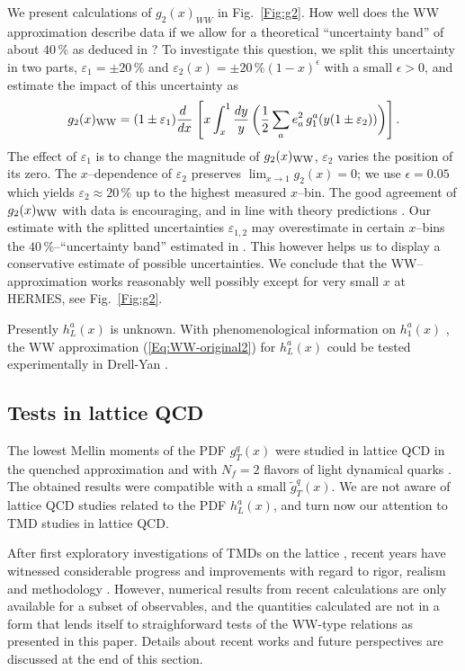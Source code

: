 \documentclass[a4paper,11pt]{article}
\newcommand{\be}{\begin{equation}}
\newcommand{\ee}{\end{equation}}
\begin{document}
We present calculations of $g_2(x)_{WW}$ in Fig.~\ref{Fig:g2}.
How well does the WW approximation describe data if we allow for a
theoretical ``uncertainty band'' of about $40\,\%$ as deduced in 
\cite{Accardi:2009au}? To investigate this question, 
we split this uncertainty in two parts, $\varepsilon_1=\pm 20\,\%$ and 
$\varepsilon_2(x)=\pm 20\,\%(1-x)^\epsilon$ with a small $\epsilon>0$,
and estimate the impact of this uncertainty as 
\be\label{Eq:g2-in-WW-model-violation}
    g_2(x)_{\rm WW} = (1\pm\varepsilon_1)\frac{ d\;}{ d x}\;\Biggl[
    x\int_x^1\frac{ d y}{y} \,\biggl(
    \frac12\sum_ae_a^2\,g_1^a(y(1\pm\varepsilon_2))\biggr)\Biggr]\,.
\ee
The effect of $\varepsilon_1$ is to change the magnitude
of $g_2(x)_{\rm WW}$, $\varepsilon_2$ varies the position of its zero.
The $x$--dependence of $\varepsilon_2$ preserves $\lim_{x\to1}g_2(x)= 0$; 
we use $\epsilon=0.05$ which yields $\varepsilon_2\approx 20\,\%$ up to 
the highest measured $x$--bin.
The good agreement of $g_2(x)_{\rm WW}$ with data is encouraging,
and in line with theory predictions \cite{Balla:1997hf}.
Our estimate with the splitted uncertainties 
$\varepsilon_{1,2}$ may overestimate in certain $x$--bins the 
$40\,\%$--``uncertainty band'' estimated in \cite{Accardi:2009au}. 
This however helps us to display a conservative estimate of possible 
uncertainties. 
We conclude that the WW--approximation works reasonably well
possibly except for very small $x$ at HERMES, see Fig.~\ref{Fig:g2}.

Presently $h_L^a(x)$ is unknown.
With phenomenological information on $h_1^a(x)$
\cite{Efremov:2006qm,Anselmino:2007fs,Anselmino:2008jk}, 
the WW approximation (\ref{Eq:WW-original2}) for $h_L^a(x)$ could 
be tested experimentally in Drell-Yan \cite{Koike:2008du}.


\subsection{Tests in lattice QCD}
\label{Sec-3.5:WW-lattice}

The lowest Mellin moments of the PDF $g_T^q(x)$ were studied in
lattice QCD in the quenched approximation \cite{Gockeler:2000ja} 
and with $N_f = 2$ flavors of light dynamical quarks \cite{Gockeler:2005vw}.
The obtained results were compatible with a small $\tilde{g}_T^q(x)$. 
We are not aware of lattice QCD studies related to the PDF $h_L^a(x)$,
and turn now our attention to TMD studies in lattice QCD.

After first exploratory investigations of TMDs on the lattice
\cite{Hagler:2009mb,Musch:2010ka}, recent years have witnessed considerable
progress and improvements with regard to rigor, realism and methodology
\cite{Yoon:2017qzo, %
Engelhardt:2015xja,%
Ji:2014hxa,%
Musch:2011er%
}.
However, numerical results from recent calculations are only available 
for a subset of observables, and the quantities calculated are not in a 
form that lends itself to straighforward tests of the WW-type relations 
as presented in this paper. Details about recent works and future 
perspectives are discussed at the end of this section.
\end{document}
